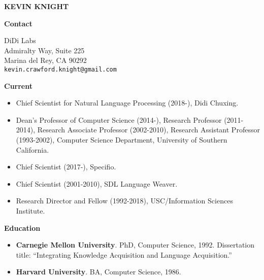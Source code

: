 

\newcommand{\hd}[1]{
\vspace*{0.2in} 
\noindent 
{\bf \Large #1}
\vspace*{0.1in} 
}

\pagestyle{plain}


\begin{center}
{\Large \bf KEVIN KNIGHT} \\
\end{center}

\vspace{0.2in}

\hd{Contact}

\bigskip

DiDi Labs \\
 Admiralty Way, Suite 225 \\
\indent
Marina del Rey, CA 90292 \\
\indent
\verb+kevin.crawford.knight@gmail.com+ 


\hd{Current}

\begin{itemize}
\item Chief Scientist for Natural Language Processing (2018-), Didi Chuxing.

\item Dean's Professor of Computer Science (2014-), 
Research Professor (2011-2014), 
Research Associate Professor (2002-2010),
Research Assistant Professor (1993-2002), 
Computer Science Department, 
University of Southern California.  

\item Chief Scientist (2017-), Specifio.

\item Chief Scientist (2001-2010), SDL Language Weaver.

\item Research Director and Fellow (1992-2018),
USC/Information Sciences Institute.
\end{itemize}


\hd{Education}

\begin{itemize}
\item {\bf Carnegie Mellon University}.  PhD, Computer Science, 1992.
Dissertation title: ``Integrating Knowledge Acquisition and Language Acquisition.''

\item {\bf Harvard University}.  BA, Computer Science, 1986.

\end{itemize}


